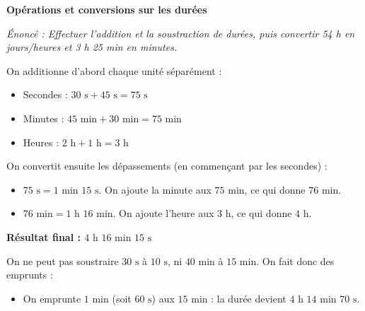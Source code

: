 \documentclass[a4paper]{book}
\begin{document}
{\newpage

    \begin{exercice}
        \textbf{Opérations et conversions sur les durées}
        
        \textit{Énoncé : Effectuer l'addition et la soustraction de durées, puis convertir 54 h en jours/heures et 3 h 25 min en minutes.}

        \begin{minipage}{0.49\linewidth}
            \begin{tcolorbox}[colback=white, colframe=gray, title=Correction - Addition]
                On additionne d'abord chaque unité séparément :
                \begin{itemize}
                    \item Secondes : $30\text{ s} + 45\text{ s} = 75\text{ s}$
                    \item Minutes : $45\text{ min} + 30\text{ min} = 75\text{ min}$
                    \item Heures : $2\text{ h} + 1\text{ h} = 3\text{ h}$
                \end{itemize}
                On convertit ensuite les dépassements (en commençant par les secondes) :
                \begin{itemize}
                    \item $75\text{ s} = 1\text{ min } 15\text{ s}$. On ajoute la minute aux $75\text{ min}$, ce qui donne $76\text{ min}$.
                    \item $76\text{ min} = 1\text{ h } 16\text{ min}$. On ajoute l'heure aux $3\text{ h}$, ce qui donne $4\text{ h}$.
                \end{itemize}
                \textbf{Résultat final : $4\text{ h } 16\text{ min } 15\text{ s}$}
            \end{tcolorbox}
        \end{minipage}
        \hfill \vline \hfill
        \begin{minipage}{0.49\linewidth}
            \begin{tcolorbox}[colback=white, colframe=gray, title=Correction - Soustraction]
                On ne peut pas soustraire $30\text{ s}$ à $10\text{ s}$, ni $40\text{ min}$ à $15\text{ min}$. On fait donc des emprunts :
                \begin{itemize}
                    \item On emprunte $1\text{ min}$ (soit $60\text{ s}$) aux $15\text{ min}$ : la durée devient $4\text{ h } 14\text{ min } 70\text{ s}$.

\end{itemize}
\end{tcolorbox}
\end{minipage}
\end{exercice}}
\end{document}
